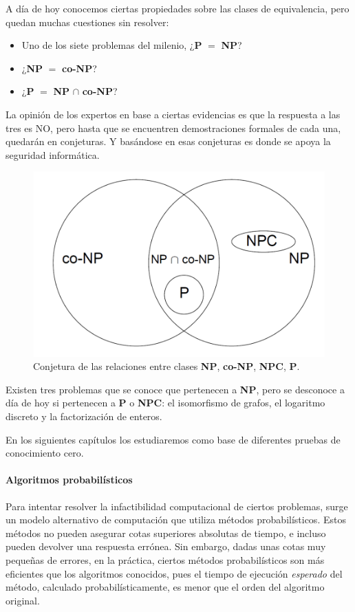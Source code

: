 A día de hoy conocemos ciertas propiedades sobre las clases de equivalencia, pero quedan muchas cuestiones sin resolver:

\begin{itemize}
	\item Uno de los siete problemas del milenio, ¿\textbf{P} $=$ \textbf{NP}?
	\item ¿\textbf{NP} $=$ \textbf{co-NP}?
	\item ¿\textbf{P} $=$ \textbf{NP} $\cap$ \textbf{co-NP}?
\end{itemize}


La opinión de los expertos en base a ciertas evidencias es que la respuesta a las tres es NO, pero hasta que se encuentren demostraciones formales de cada una, quedarán en conjeturas. Y basándose en esas conjeturas es donde se apoya la seguridad informática.


\begin{figure}[bth]
	\begin{center}
		\includegraphics[width=.45\linewidth]{gfx/NPclasses}
	\end{center}
	\caption{Conjetura de las relaciones entre clases \textbf{NP}, \textbf{co-NP}, \textbf{NPC}, \textbf{P}.}
	\label{fig:NPclasses}
\end{figure}


Existen tres problemas que se conoce que pertenecen a \textbf{NP}, pero se desconoce a día de hoy si pertenecen a \textbf{P} o \textbf{NPC}: el isomorfismo de grafos, el logaritmo discreto y la factorización de enteros.

En los siguientes capítulos los estudiaremos como base de diferentes pruebas de conocimiento cero.


\hfil


\paragraph{Algoritmos probabilísticos} 

\hfil

Para intentar resolver la infactibilidad computacional de ciertos problemas, surge un modelo alternativo de computación que utiliza métodos probabilísticos. Estos métodos no pueden asegurar cotas superiores absolutas de tiempo, e incluso pueden devolver una respuesta errónea. Sin embargo, dadas unas cotas muy pequeñas de errores, en la práctica, ciertos métodos probabilísticos son más eficientes que los algoritmos conocidos, pues el tiempo de ejecución \textit{esperado} del método, calculado probabilísticamente, es menor que el orden del algoritmo original.


